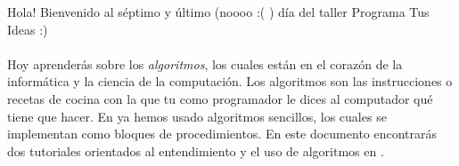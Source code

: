 Hola! Bienvenido al séptimo y último (noooo :( ) día del taller Programa Tus Ideas :)

\paragraph{}
Hoy aprenderás sobre los \emph{algoritmos}, los cuales están en el
corazón de la informática y la ciencia de la computación. Los
algoritmos son las instrucciones o recetas de cocina con la que tu
como programador le dices al computador qué tiene que hacer. En
\AppInventor ya hemos usado algoritmos sencillos, los cuales se
implementan como bloques de procedimientos. En este documento
encontrarás dos tutoriales orientados al entendimiento y el uso de
algoritmos en \AppInventor.
